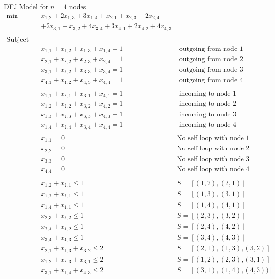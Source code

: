 \begin{example}{DFJ Model for $n=4$ nodes}{}
\begin{align*}\min\quad & x_{1,2} + 2 x_{1,3} + 3 x_{1,4} + x_{2,1} + x_{2,3} + 2 x_{2,4} \\& + 2 x_{3,1} + x_{3,2} + 4 x_{3,4} + 3 x_{4,1} + 2 x_{4,2} + 4 x_{4,3}\\
\\
\text{Subject to} \quad \\
 & x_{1,1} + x_{1,2} + x_{1,3} + x_{1,4} = 1& \text{ outgoing from node 1}\\
  & x_{2,1} + x_{2,2} + x_{2,3} + x_{2,4} = 1& \text{ outgoing from node 2}\\
 & x_{3,1} + x_{3,2} + x_{3,3} + x_{3,4} = 1& \text{ outgoing from node 3}\\
 & x_{4,1} + x_{4,2} + x_{4,3} + x_{4,4} = 1& \text{ outgoing from node 4}\\
 \\
  & x_{1,1} + x_{2,1} + x_{3,1} + x_{4,1} = 1& \text{ incoming to node 1}\\
 & x_{1,2} + x_{2,2} + x_{3,2} + x_{4,2} = 1& \text{ incoming to node 2}\\
 & x_{1,3} + x_{2,3} + x_{3,3} + x_{4,3} = 1& \text{ incoming to node 3}\\ 
 & x_{1,4} + x_{2,4} + x_{3,4} + x_{4,4} = 1& \text{ incoming to node 4}\\
 \\
 & x_{1,1} = 0 & \text{No self loop with node 1}\\
 & x_{2,2} = 0& \text{No self loop with node 2}\\
 & x_{3,3} = 0& \text{No self loop with node 3}\\
 & x_{4,4} = 0& \text{No self loop with node 4}\\
 \\
 & x_{1,2} + x_{2,1} \leq 1& S = [(1,2), (2,1)]\\
 & x_{1,3} + x_{3,1} \leq 1& S = [(1,3), (3,1)]\\
 & x_{1,4} + x_{4,1} \leq 1& S = [(1,4), (4,1)]\\
 & x_{2,3} + x_{3,2} \leq 1& S = [(2,3), (3,2)]\\
 & x_{2,4} + x_{4,2} \leq 1& S = [(2,4), (4,2)]\\
 & x_{3,4} + x_{4,3} \leq 1& S = [(3,4), (4,3)]\\
 & x_{2,1} + x_{1,3} + x_{3,2} \leq 2 & S = [(2,1), (1,3), (3,2)]\\
 & x_{1,2} + x_{2,3} + x_{3,1} \leq 2& S = [(1,2), (2,3), (3,1)]\\
 & x_{3,1} + x_{1,4} + x_{4,3} \leq 2& S = [(3,1), (1,4), (4,3))]\\

\end{align*}
\end{example}
